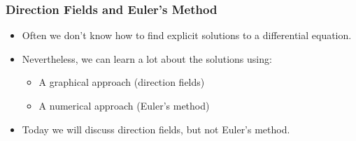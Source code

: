 \begin{frame}
\frametitle{Direction Fields and Euler's Method} 
\begin{itemize}
\item  Often we don't know how to find explicit solutions to a differential equation.
\item  Nevertheless, we can learn a lot about the solutions using:
\begin{itemize}
\item  A graphical approach (direction fields)
\item  A numerical approach (Euler's method)
\end{itemize}
\item<2->  Today we will discuss direction fields, but not Euler's method.
\end{itemize}
\end{frame}
